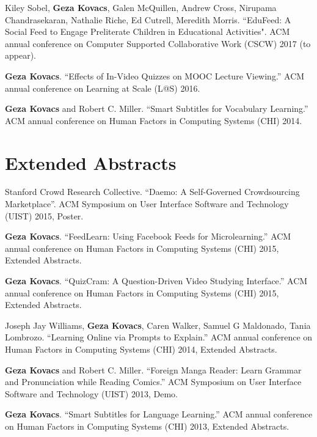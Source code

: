\documentclass[margin,line]{resume}
\begin{document}
\begin{resume}

Kiley Sobel, \textbf{Geza Kovacs}, Galen McQuillen, Andrew Cross, Nirupama Chandrasekaran, Nathalie Riche, Ed Cutrell, Meredith Morris. ``EduFeed: A Social Feed to Engage Preliterate Children in Educational Activities". ACM annual conference on Computer Supported Collaborative Work (CSCW) 2017 (to appear). %

\textbf{Geza Kovacs}. ``Effects of In-Video Quizzes on MOOC Lecture Viewing.'' ACM annual conference on Learning at Scale (L@S) 2016. %

\textbf{Geza Kovacs} and Robert C. Miller. ``Smart Subtitles for Vocabulary Learning.'' ACM annual conference on Human Factors in Computing Systems (CHI) 2014. %


\section{\mysidestyle Extended Abstracts}

Stanford Crowd Research Collective. ``Daemo: A Self-Governed Crowdsourcing Marketplace''. ACM Symposium on User Interface Software and Technology (UIST) 2015, Poster.

\textbf{Geza Kovacs}. ``FeedLearn: Using Facebook Feeds for Microlearning.'' ACM annual conference on Human Factors in Computing Systems (CHI) 2015, Extended Abstracts. %

\textbf{Geza Kovacs}. ``QuizCram: A Question-Driven Video Studying Interface.'' ACM annual conference on Human Factors in Computing Systems (CHI) 2015, Extended Abstracts.

Joseph Jay Williams, \textbf{Geza Kovacs}, Caren Walker, Samuel G Maldonado, Tania Lombrozo. ``Learning Online via Prompts to Explain.'' ACM annual conference on Human Factors in Computing Systems (CHI) 2014, Extended Abstracts.

\textbf{Geza Kovacs} and Robert C. Miller. ``Foreign Manga Reader: Learn Grammar and Pronunciation while Reading Comics.'' ACM Symposium on User Interface Software and Technology (UIST) 2013, Demo.

\textbf{Geza Kovacs}. ``Smart Subtitles for Language Learning.'' ACM annual conference on Human Factors in Computing Systems (CHI) 2013, Extended Abstracts.%


\end{resume}
\end{document}
